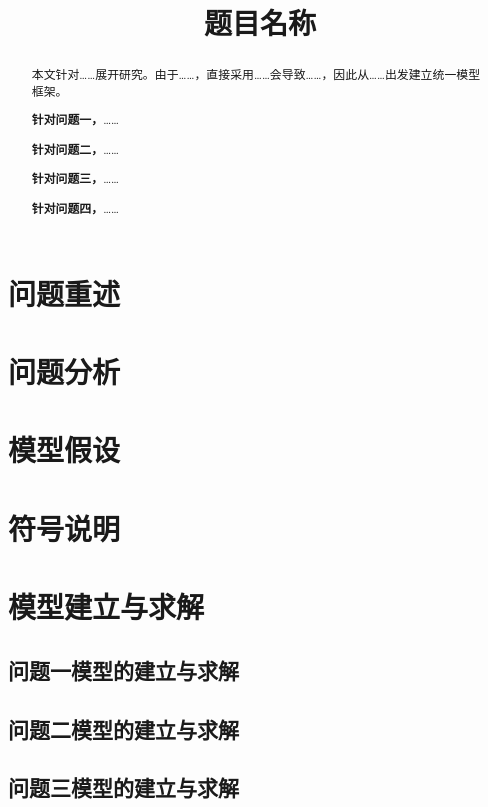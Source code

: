 \documentclass[withoutpreface,bwprint]{cumcmthesis}
\title{题目名称}
\begin{document}
\maketitle

\begin{abstract}
本文针对……展开研究。由于……，直接采用……会导致……，因此从……出发建立统一模型框架。

\textbf{针对问题一，}……

\textbf{针对问题二，}……

\textbf{针对问题三，}……

\textbf{针对问题四，}……

\end{abstract}

\section{问题重述}

\section{问题分析}

\section{模型假设}

\section{符号说明}

\section{模型建立与求解}

\subsection{问题一模型的建立与求解}

\subsection{问题二模型的建立与求解}

\subsection{问题三模型的建立与求解}
\end{document}
